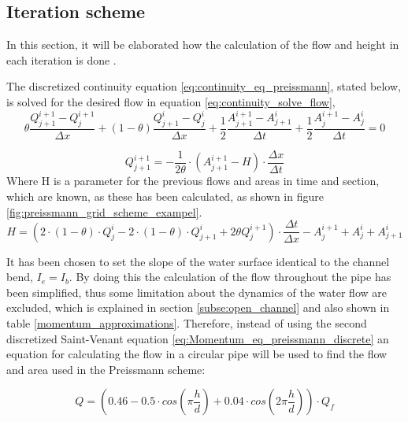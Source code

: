 \subsection{Iteration scheme} 
In this section, it will be elaborated how the calculation of the flow and height in each iteration is done \cite{ikke_stationear}.

The discretized continuity equation \ref{eq:continuity_eq_preissmann}, stated below, is solved for the desired flow in equation \ref{eq:continuity_solve_flow},
\begin{equation}
    \theta \frac{Q_{j+1}^{i+1}-Q_j^{i+1}}{\Delta x}+(1-\theta)\frac{Q_{j+1}^i - Q_j^i}{\Delta x}+
    \frac{1}{2}\frac{A_{j+1}^{i+1}-A_{j+1}^i}{\Delta t} + \frac{1}{2} \frac{A_{j}^{i+1} - A_j^i}{\Delta t} = 0
\end{equation}

\begin{equation}\label{eq:continuity_solve_flow}
    Q_{j+1}^{i+1} = - \frac{1}{2\theta}\cdot\left(A_{j+1}^{i+1}-H\right)\cdot\frac{\Delta x}{\Delta t}
\end{equation}
Where H is a parameter for the previous flows and areas in time and section, which are known, as these has been calculated, as shown in figure \ref{fig:preissmann_grid_scheme_exampel}. 
\begin{equation}
    H = \left(2\cdot(1-\theta)\cdot Q_j^i-2\cdot(1-\theta)\cdot Q_{j+1}^i+2\theta Q_j^{i+1}\right)\cdot\frac{\Delta t}{\Delta x}- A_{j}^{i+1}+A_j^i+A_{j+1}^i
\end{equation}

It has been chosen to set the slope of the water surface identical to the channel bend, $I_e = I_b$. By doing this the calculation of the flow throughout the pipe has been simplified, thus some limitation about the dynamics of the water flow are excluded, which is explained in section \ref{subse:open_channel} and also shown in table \ref{momentum_approximations}. Therefore, instead of using the second discretized Saint-Venant equation \ref{eq:Momentum_eq_preissmann_discrete} an equation for calculating the flow in a circular pipe will be used \cite{ikke_stationear} to find the flow and area used in the Preissmann scheme:

\begin{equation}\label{eq:calc_for_flowv2}
     Q = \left(0.46-0.5 \cdot cos\left(\pi \frac{h}{d}\right)+0.04\cdot cos\left(2\pi\frac{h}{d}\right)\right)\cdot Q_f
\end{equation}

